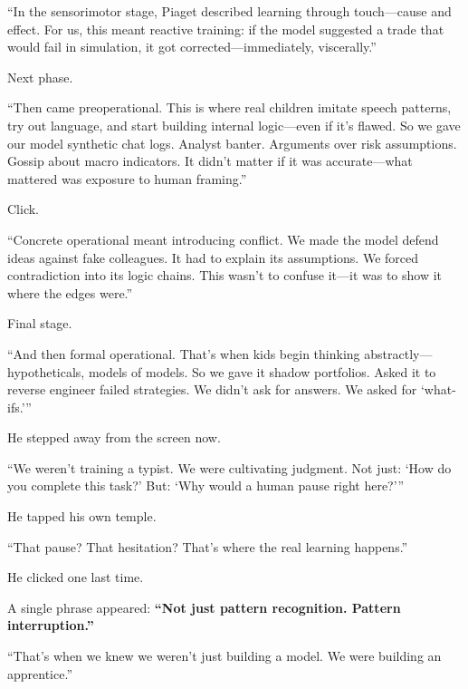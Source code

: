 “In the sensorimotor stage, Piaget described learning through touch—cause and effect.
For us, this meant reactive training: if the model suggested a trade that would fail in simulation,
it got corrected—immediately, viscerally.”

Next phase.

“Then came preoperational. This is where real children imitate speech patterns,
try out language, and start building internal logic—even if it’s flawed.
So we gave our model synthetic chat logs. Analyst banter.
Arguments over risk assumptions. Gossip about macro indicators.
It didn’t matter if it was accurate—what mattered was exposure to human framing.”

Click.

“Concrete operational meant introducing conflict.
We made the model defend ideas against fake colleagues.
It had to explain its assumptions.
We forced contradiction into its logic chains.
This wasn’t to confuse it—it was to show it where the edges were.”

Final stage.

“And then formal operational.
That’s when kids begin thinking abstractly—hypotheticals, models of models.
So we gave it shadow portfolios. Asked it to reverse engineer failed strategies.
We didn’t ask for answers. We asked for ‘what-ifs.’”

He stepped away from the screen now.

“We weren’t training a typist.
We were cultivating judgment.
Not just: ‘How do you complete this task?’
But: ‘Why would a human pause right here?’”

He tapped his own temple.

“That pause? That hesitation?
That’s where the real learning happens.”

He clicked one last time.

A single phrase appeared:
\textbf{“Not just pattern recognition. Pattern interruption.”}

“That’s when we knew we weren’t just building a model.
We were building an apprentice.”

